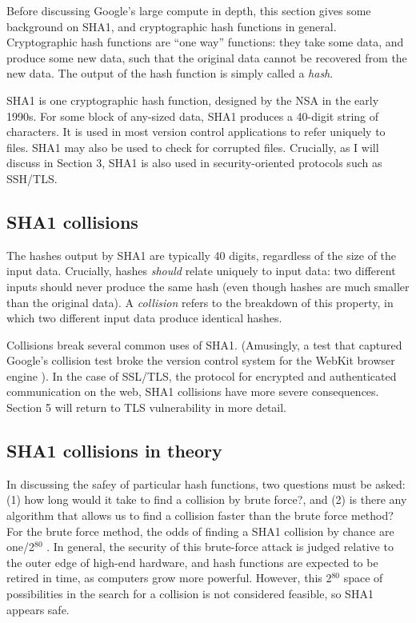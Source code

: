 \documentclass[sigconf]{acmart}
\begin{document}
Before discussing Google's large compute in depth,
this section gives some background on SHA1, and cryptographic hash functions in general.
Cryptographic hash functions are ``one way'' functions: 
they take some data, and produce some new data, such that the original data cannot be recovered from the new data. The output of the hash function is simply called a \emph{hash}.

SHA1 is one cryptographic hash function, designed by the NSA in the early 1990s.
For some block of any-sized data, SHA1 produces a 40-digit string of characters.
It is used in most version control applications to refer uniquely to files. SHA1 may also be used to check for corrupted files. 
Crucially, as I will discuss in Section 3, SHA1 is also used in security-oriented protocols such as SSH/TLS.


\subsection{SHA1 collisions}
\label{sec:org0441048}

The hashes output by SHA1 are typically 40 digits, regardless of the size of the input data.
Crucially, hashes \emph{should} relate uniquely to input data: 
two different inputs should never produce the same hash (even though hashes are much smaller than the original data).
A \emph{collision} refers to the breakdown of this property,
in which two different input data produce identical hashes.

Collisions break several common uses of SHA1. 
(Amusingly, a test that captured Google's collision test broke the version control system for the WebKit browser engine \cite{Koivisto2017}).
In the case of SSL/TLS, the protocol for encrypted and authenticated communication on the web, SHA1 collisions have more severe consequences.
Section 5 will return to TLS vulnerability in more detail.

\subsection{SHA1 collisions in theory}
\label{sec:orgb57dbed}

In discussing the safey of particular hash functions, two questions must be asked:
(1) how long would it take to find a collision by brute force?, and 
(2) is there any algorithm that allows us to find a collision faster than the brute force method?
For the brute force method, the odds of finding a SHA1 collision by chance are one/2\(^{\text{80}}\)
\cite{Schneier2005}.
In general, the security of this brute-force attack is judged relative to the outer edge of high-end hardware, and hash functions are expected to be retired in time, as computers grow more powerful.
However, this 2\(^{\text{80}}\) space of possibilities in the search for a collision is not considered feasible, so SHA1 appears safe.
\end{document}
